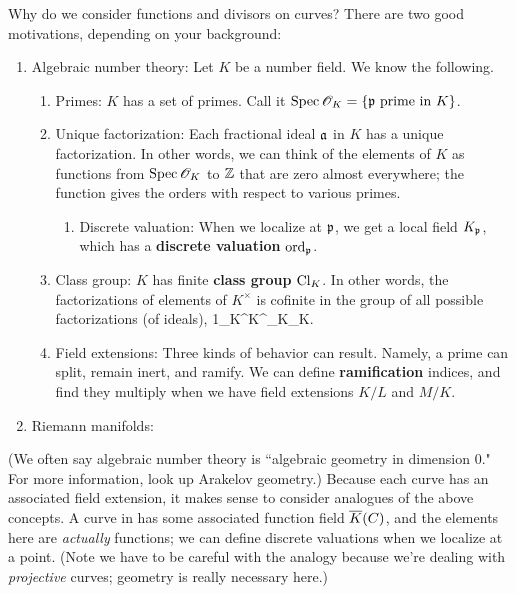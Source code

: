 Why do we consider functions and divisors on curves? There are two good motivations, depending on your background:
\begin{enumerate}
\item
Algebraic number theory: Let $K$ be a number field. We know the following.
\begin{enumerate}
\item 
Primes: $K$ has a set of primes. Call it $\operatorname{Spec} \mathscr{O}_K=\{\mathfrak{p}\text{ prime in }K\}$.
\item 
Unique factorization: Each fractional ideal $\mathfrak{a}$ in $K$ has a unique factorization. In other words, we can think of the elements of $K$ as functions from $\operatorname{Spec} \mathscr{O}_K$ to $\mathbb{Z}$ that are zero almost everywhere; the function gives the orders with respect to various primes.
\begin{enumerate}
\item
Discrete valuation: When we localize at $\mathfrak{p}$, we get a local field $K_{\mathfrak{p}}$, which has a \textbf{discrete valuation} $\operatorname{ord}_{\mathfrak{p}}$.
\end{enumerate}
\item
Class group: $K$ has finite \textbf{class group} $\operatorname{Cl}_K$. In other words, the factorizations of elements of $K^{\times}$ is cofinite in the group of all possible factorizations (of ideals),
1\to\sO_K^{\times}\to  K^{\times}\to \Id_K\to \Cl_K.
\eeq
\item 
Field extensions: Three kinds of behavior can result. Namely, a prime can split, remain inert, and ramify. We can define \textbf{ramification} indices, and find they multiply when we have field extensions $K/L$ and $M/K$.
\end{enumerate}
\item
Riemann manifolds: 
\end{enumerate}
(We often say algebraic number theory is ``algebraic geometry in dimension 0." For more information, look up Arakelov geometry.) 
Because each curve has an associated field extension, it makes sense to consider analogues of the above concepts. A curve in %
has some associated function field $\overline{K}(C)$, and the elements here are {\it actually} functions; we can define discrete valuations when we localize at a point. (Note we have to be careful with the analogy because we're dealing with {\it projective} curves; geometry is really necessary here.)

